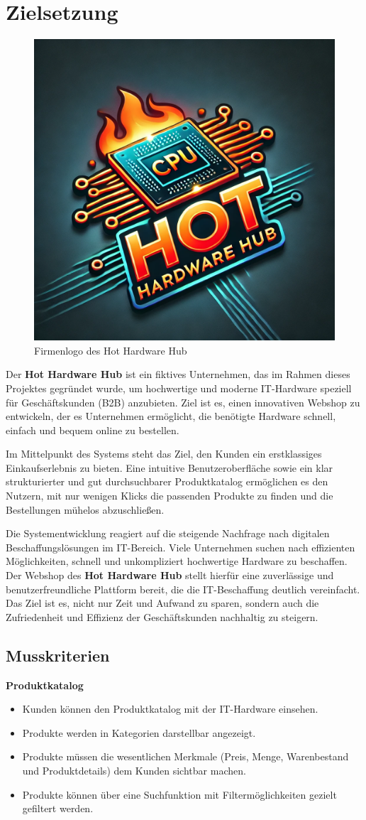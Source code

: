 \documentclass[%
	ngerman,
	12pt,
	a4paper,
	oneside,
	parskip=full
]{scrbook}
\begin{document}
\chapter{Zielsetzung}
\begin{figure}[ht]
	\centering
	\includegraphics[width=0.5\linewidth]{"Media/Hot Hardware Hub Logo"}
	\caption[Logo Hot Hardware Hub]{Firmenlogo des Hot Hardware Hub}
	\label{fig:hot-hardware-hub-logo}
\end{figure}
Der \textbf{Hot Hardware Hub} ist ein fiktives Unternehmen, das im Rahmen dieses Projektes gegründet wurde, um hochwertige und moderne IT-Hardware speziell für Geschäftskunden (B2B) anzubieten.
Ziel ist es, einen innovativen Webshop zu entwickeln, der es Unternehmen ermöglicht, die benötigte Hardware schnell, einfach und bequem online zu bestellen.

Im Mittelpunkt des Systems steht das Ziel, den Kunden ein erstklassiges Einkaufserlebnis zu bieten.
Eine intuitive Benutzeroberfläche sowie ein klar strukturierter und gut durchsuchbarer Produktkatalog ermöglichen es den Nutzern, mit nur wenigen Klicks die passenden Produkte zu finden und die Bestellungen mühelos abzuschließen.

Die Systementwicklung reagiert auf die steigende Nachfrage nach digitalen Beschaffungslösungen im IT-Bereich.
Viele Unternehmen suchen nach effizienten Möglichkeiten, schnell und unkompliziert hochwertige Hardware zu beschaffen.
Der Webshop des \textbf{Hot Hardware Hub} stellt hierfür eine zuverlässige und benutzerfreundliche Plattform bereit, die die IT-Beschaffung deutlich vereinfacht.
Das Ziel ist es, nicht nur Zeit und Aufwand zu sparen, sondern auch die Zufriedenheit und Effizienz der Geschäftskunden nachhaltig zu steigern.

\section{Musskriterien}
	\vspace{0.5cm}
	\textbf{Produktkatalog}
	\begin{itemize}
		\item Kunden können den Produktkatalog mit der IT-Hardware einsehen.
		\item Produkte werden in Kategorien darstellbar angezeigt.
		\item Produkte müssen die wesentlichen Merkmale (Preis, Menge, Warenbestand und Produktdetails) dem Kunden sichtbar machen.
		\item Produkte können über eine Suchfunktion mit Filtermöglichkeiten gezielt gefiltert werden.
	\end{itemize}
\end{document}
